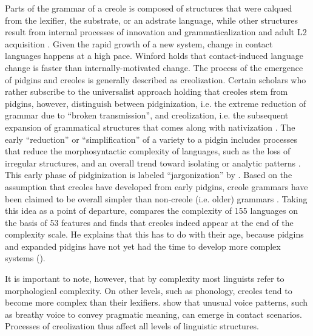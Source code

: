 \documentclass[output=paper,
modfonts
]{langscibook}
\begin{document}
Parts of the grammar of a creole is composed of structures that were calqued from the lexifier, the substrate, or an adstrate language, while other structures result from internal processes of innovation and grammaticalization and adult L2 acquisition \citep{bakker2008pidgins,bartens2013creole}. Given the rapid growth of a new system, change in contact languages happens at a high pace. Winford \citep[in][]{baptista2017competition} holds that contact-induced language change is faster than internally-motivated change. The process of the emergence of pidgins and creoles is generally described as creolization. Certain scholars who rather subscribe to the universalist approach holding that creoles stem from pidgins, however, distinguish between pidginization, i.e. the extreme reduction of grammar due to “broken transmission”, and creolization, i.e. the subsequent expansion of grammatical structures that comes along with nativization \citep[e.g.][3,9]{parkvall2000out}. The early “reduction” \citep{bakker2008pidgins} or “simplification” \citep{mcworther2011why} of a variety to a pidgin includes processes that reduce the morphosyntactic complexity of languages, such as the loss of irregular structures, and an overall trend toward isolating or analytic patterns \citep{trudgill2011sociolinguistic}. This early phase of pidginization is labeled “jargonization” by \cite[50]{good2013typologizing}. Based on the assumption that creoles have developed from early pidgins, creole grammars have been claimed to be overall simpler than non-creole (i.e. older) grammars \citep{mcworther2011why}. Taking this idea as a point of departure, \cite{parkvall2008simplicity} compares the complexity of 155 languages on the basis of 53 features and finds that creoles indeed appear at the end of the complexity scale. He explains that this has to do with their age, because pidgins and expanded pidgins have not yet had the time to develop more complex systems (\citeyear[283]{parkvall2008simplicity}).

It is important to note, however, that by complexity most linguists refer to morphological complexity. On other levels, such as phonology, creoles tend to become more complex than their lexifiers. \cite{perezetal2019relevance} show that unusual voice patterns, such as breathy voice to convey pragmatic meaning, can emerge in contact scenarios. Processes of creolization thus affect all levels of linguistic structures.
\end{document}
